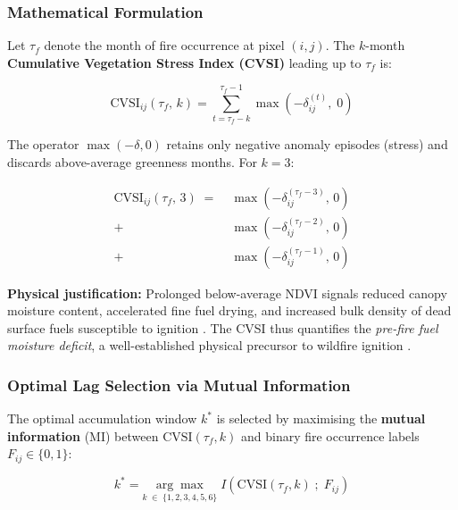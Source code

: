 \documentclass[12pt, a4paper]{article}
\begin{document}
\subsubsection{Mathematical Formulation}

Let $\tau_f$ denote the month of fire occurrence at pixel $(i,j)$.
The $k$-month \textbf{Cumulative Vegetation Stress Index (CVSI)}
leading up to $\tau_f$ is:

\begin{equation}
    \boxed{
    \text{CVSI}_{ij}(\tau_f,\, k) =
    \sum_{t = \tau_f - k}^{\tau_f - 1}
    \max\!\left(-\delta_{ij}^{(t)},\; 0\right)
    }
    \label{eq:cvsi}
\end{equation}

The operator $\max(-\delta, 0)$ retains only negative anomaly episodes
(stress) and discards above-average greenness months. For $k = 3$:

\begin{align}
    \text{CVSI}_{ij}(\tau_f,\, 3) \;=\;&
    \max\!\left(-\delta_{ij}^{(\tau_f - 3)},\, 0\right) \nonumber \\
    +\;& \max\!\left(-\delta_{ij}^{(\tau_f - 2)},\, 0\right) \nonumber \\
    +\;& \max\!\left(-\delta_{ij}^{(\tau_f - 1)},\, 0\right)
    \label{eq:cvsi3}
\end{align}

\textbf{Physical justification:} Prolonged below-average NDVI signals
reduced canopy moisture content, accelerated fine fuel drying, and
increased bulk density of dead surface fuels susceptible to ignition
\citep{chuvieco2004}. The CVSI thus quantifies the \emph{pre-fire
fuel moisture deficit}, a well-established physical precursor to
wildfire ignition \citep{flannigan2000}.

\subsubsection{Optimal Lag Selection via Mutual Information}
\label{sec:mi_lag}

The optimal accumulation window $k^{*}$ is selected by maximising the
\textbf{mutual information} (MI) between $\text{CVSI}(\tau_f, k)$
and binary fire occurrence labels $F_{ij} \in \{0, 1\}$:

\begin{equation}
    k^{*} = \underset{k \;\in\; \{1,2,3,4,5,6\}}{\arg\max}\;
    I\!\left(\text{CVSI}(\tau_f, k)\;;\; F_{ij}\right)
    \label{eq:mi_lag}
\end{equation}
\end{document}
